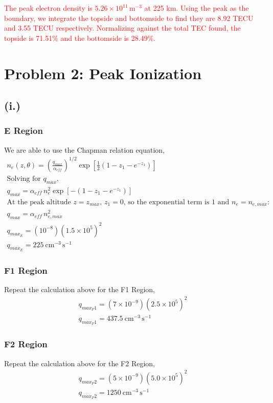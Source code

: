 \documentclass[11pt]{article}
\begin{document}
\hspace*{2em}\textcolor{red}{The peak electron density is $5.26\times10^{11}\,\mathrm{m^{-3}}$ at 225 km. Using the peak as the boundary,
we integrate the topside and bottomside to find they are 8.92 TECU and 3.55 TECU respectively.
Normalizing against the total TEC found, the topside is 71.51\% and the bottomside is 28.49\%.}

\newpage
\section*{Problem 2: Peak Ionization}
\subsection*{(i.)}
\subsubsection*{E Region}
We are able to use the Chapman relation equation,
\begin{gather*}
n_e(z,\theta) = \left(\frac{q_{max}}{\alpha_{eff}}\right)^{1/2} \exp\!\left[\frac{1}{2}\left(1 - z_1 - e^{-z_1}\right)\right] \\
\text{Solving for $q_{max}$,} \\
q_{max} = \alpha_{eff}\, n_e^2 \exp\!\left[-\left(1 - z_1 - e^{-z_1}\right)\right] \\
\text{At the peak altitude $z = z_{max}$, $z_1 = 0$, so the exponential term is 1 and $n_e = n_{e,max}$:} \\
q_{max} = \alpha_{eff}\, n_{e,max}^2 \\
q_{max_E} = (10^{-8})(1.5\times10^{5})^2 \\
\boxed{q_{max_E}= 225~\mathrm{cm^{-3}\,s^{-1}}}
\end{gather*}
\subsubsection*{F1 Region}
Repeat the calculation above for the F1 Region,
\begin{gather*}
q_{max_F1} = (7\times10^{-9})(2.5\times10^{5})^2 \\
\boxed{q_{max_F1}= 437.5~\mathrm{cm^{-3}\,s^{-1}}}
\end{gather*}
\subsubsection*{F2 Region}
Repeat the calculation above for the F2 Region,
\begin{gather*}
q_{max_F2} = (5\times10^{-9})(5.0\times10^{5})^2 \\
\boxed{q_{max_F2}= 1250~\mathrm{cm^{-3}\,s^{-1}}}
\end{gather*}
\end{document}
